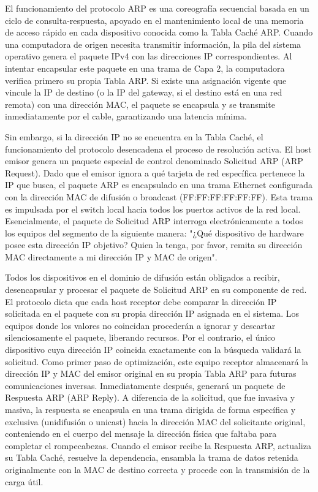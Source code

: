 \documentclass[a4paper,12pt]{article}
\begin{document}
El funcionamiento del protocolo ARP es una coreografía secuencial basada en un ciclo de consulta-respuesta, apoyado en el mantenimiento local de una memoria de acceso rápido en cada dispositivo conocida como la Tabla Caché ARP. Cuando una computadora de origen necesita transmitir información, la pila del sistema operativo genera el paquete IPv4 con las direcciones IP correspondientes. Al intentar encapsular este paquete en una trama de Capa 2, la computadora verifica primero su propia Tabla ARP. Si existe una asignación vigente que vincule la IP de destino (o la IP del gateway, si el destino está en una red remota) con una dirección MAC, el paquete se encapsula y se transmite inmediatamente por el cable, garantizando una latencia mínima.

Sin embargo, si la dirección IP no se encuentra en la Tabla Caché, el funcionamiento del protocolo desencadena el proceso de resolución activa. El host emisor genera un paquete especial de control denominado Solicitud ARP (ARP Request). Dado que el emisor ignora a qué tarjeta de red específica pertenece la IP que busca, el paquete ARP es encapsulado en una trama Ethernet configurada con la dirección MAC de difusión o broadcast (FF:FF:FF:FF:FF:FF). Esta trama es impulsada por el switch local hacia todos los puertos activos de la red local. Esencialmente, el paquete de Solicitud ARP interroga electrónicamente a todos los equipos del segmento de la siguiente manera: "¿Qué dispositivo de hardware posee esta dirección IP objetivo? Quien la tenga, por favor, remita su dirección MAC directamente a mi dirección IP y MAC de origen". 

Todos los dispositivos en el dominio de difusión están obligados a recibir, desencapsular y procesar el paquete de Solicitud ARP en su componente de red. El protocolo dicta que cada host receptor debe comparar la dirección IP solicitada en el paquete con su propia dirección IP asignada en el sistema. Los equipos donde los valores no coincidan procederán a ignorar y descartar silenciosamente el paquete, liberando recursos. Por el contrario, el único dispositivo cuya dirección IP coincida exactamente con la búsqueda validará la solicitud. Como primer paso de optimización, este equipo receptor almacenará la dirección IP y MAC del emisor original en su propia Tabla ARP para futuras comunicaciones inversas. Inmediatamente después, generará un paquete de Respuesta ARP (ARP Reply). A diferencia de la solicitud, que fue invasiva y masiva, la respuesta se encapsula en una trama dirigida de forma específica y exclusiva (unidifusión o unicast) hacia la dirección MAC del solicitante original, conteniendo en el cuerpo del mensaje la dirección física que faltaba para completar el rompecabezas. Cuando el emisor recibe la Respuesta ARP, actualiza su Tabla Caché, resuelve la dependencia, ensambla la trama de datos retenida originalmente con la MAC de destino correcta y procede con la transmisión de la carga útil.
\end{document}
